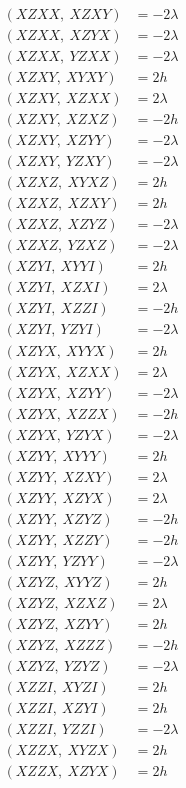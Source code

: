 \documentclass{article}
\begin{document}
\begin{align*}
  (XZXX,\ XZXY) &= - 2 \lambda \\
  (XZXX,\ XZYX) &= - 2 \lambda \\
  (XZXX,\ YZXX) &= - 2 \lambda \\
  (XZXY,\ XYXY) &= 2 h \\
  (XZXY,\ XZXX) &= 2 \lambda \\
  (XZXY,\ XZXZ) &= - 2 h \\
  (XZXY,\ XZYY) &= - 2 \lambda \\
  (XZXY,\ YZXY) &= - 2 \lambda \\
  (XZXZ,\ XYXZ) &= 2 h \\
  (XZXZ,\ XZXY) &= 2 h \\
  (XZXZ,\ XZYZ) &= - 2 \lambda \\
  (XZXZ,\ YZXZ) &= - 2 \lambda \\
  (XZYI,\ XYYI) &= 2 h \\
  (XZYI,\ XZXI) &= 2 \lambda \\
  (XZYI,\ XZZI) &= - 2 h \\
  (XZYI,\ YZYI) &= - 2 \lambda \\
  (XZYX,\ XYYX) &= 2 h \\
  (XZYX,\ XZXX) &= 2 \lambda \\
  (XZYX,\ XZYY) &= - 2 \lambda \\
  (XZYX,\ XZZX) &= - 2 h \\
  (XZYX,\ YZYX) &= - 2 \lambda \\
  (XZYY,\ XYYY) &= 2 h \\
  (XZYY,\ XZXY) &= 2 \lambda \\
  (XZYY,\ XZYX) &= 2 \lambda \\
  (XZYY,\ XZYZ) &= - 2 h \\
  (XZYY,\ XZZY) &= - 2 h \\
  (XZYY,\ YZYY) &= - 2 \lambda \\
  (XZYZ,\ XYYZ) &= 2 h \\
  (XZYZ,\ XZXZ) &= 2 \lambda \\
  (XZYZ,\ XZYY) &= 2 h \\
  (XZYZ,\ XZZZ) &= - 2 h \\
  (XZYZ,\ YZYZ) &= - 2 \lambda \\
  (XZZI,\ XYZI) &= 2 h \\
  (XZZI,\ XZYI) &= 2 h \\
  (XZZI,\ YZZI) &= - 2 \lambda \\
  (XZZX,\ XYZX) &= 2 h \\
  (XZZX,\ XZYX) &= 2 h \\

\end{align*}
\end{document}
